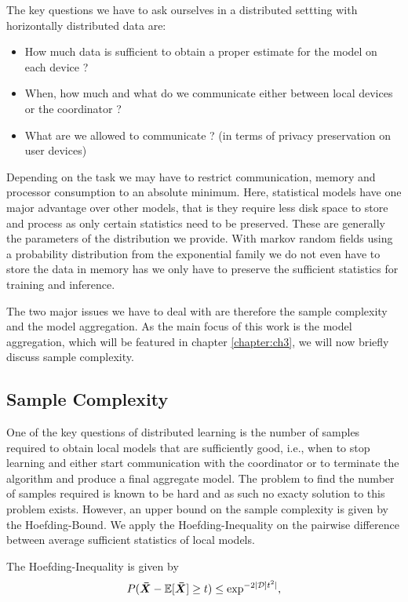 The key questions we have to ask ourselves in a distributed settting with horizontally distributed data are:
\begin{itemize}
    \item How much data is sufficient to obtain a proper estimate for the model on each device ? 
    \item When, how much and what do we communicate either between local devices or the coordinator ?
    \item What are we allowed to communicate ? (in terms of privacy preservation on user devices)
\end{itemize}

Depending on the task we may have to restrict communication, memory and processor consumption to an absolute minimum.
Here, statistical models have one major advantage over other models, that is they require less disk space to store and process as only certain statistics need to be preserved.
These are generally the parameters of the distribution we provide.
With markov random fields using a probability distribution from the exponential family we do not even have to store the data in memory has we only have to preserve the sufficient statistics for training and inference.

The two major issues we have to deal with are therefore the sample complexity and the model aggregation.
As the main focus of this work is the model aggregation, which will be featured in chapter \ref{chapter:ch3}, we will now briefly discuss sample complexity.

\subsection{Sample Complexity}
One of the key questions of distributed learning is the number of samples required to obtain local models that are sufficiently good, i.e., when to stop learning and either start communication with the coordinator
or to terminate the algorithm and produce a final aggregate model. 
The problem to find the number of samples required is known to be hard  and as such no exacty solution to this problem exists.
However, an upper bound on the sample complexity is given by the Hoefding-Bound. 
We apply the Hoefding-Inequality on the pairwise difference between average sufficient statistics of local models.

The Hoefding-Inequality is given by
\begin{equation}
    P(\boldsymbol{\bar{X}} - \mathbb{E}[\boldsymbol{\bar{X}}] \geq t ) \leq \exp^{-2\lvert\mathcal{D}]t^2\rvert},
\end{equation}

